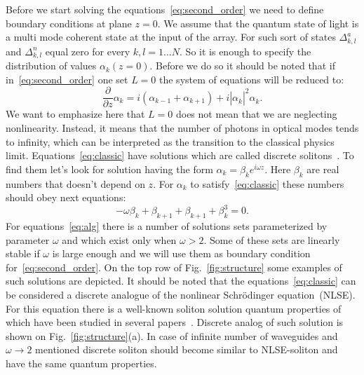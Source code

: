 \documentclass{osa-article}
\begin{document}
\par
Before we start solving the equations~\eqref{eq:second_order}
we need to define boundary conditions at plane $z=0$. 
We assume that the quantum state of light is a multi mode coherent state at the input of the array. For such sort of states $\Delta^{a}_{k,l}$ and $\Delta^{n}_{k,l}$ equal zero for every $k,l = 1\ldots N$. So it is enough to specify the distribution of values $\alpha_k\!\left(z=0\right)$. Before we do so it should be noted that if in~\eqref{eq:second_order} one set $L=0$ the system of equations will be reduced to:
\begin{equation}\label{eq:classic}
	\dfrac{\partial}{\partial z}\alpha_{k}\! =\! i\left(\alpha_{k-1}\! +\! \alpha_{k+1} \right) \!+\! i\left|\alpha^{\phantom{*}}_{k}\!\right|^{2}\alpha^{\phantom{*}}_{k}.
\end{equation}
We want to emphasize here that $ L = 0 $ does not mean that we are neglecting nonlinearity. 
Instead, it means that the number of photons in optical modes tends to infinity, which can be interpreted as the transition to the classical physics limit. 
Equations~\eqref{eq:classic} have solutions which are called discrete solitons~\cite{kevrekidis_discrete_2009}.  
To find them let's look for solution having the form $\alpha_{k} = \beta_k e^{i\omega z}$. Here $\beta_k$ are real numbers that doesn't depend on $z$. 
For $\alpha_{k}$ to satisfy~\eqref{eq:classic} these numbers should obey next equations:
\begin{equation}\label{eq:alg}
	-\omega \beta_k +\beta_{k+1 } + \beta_{k+1} + \beta^{3}_k = 0.
\end{equation}
For equations~\eqref{eq:alg} there is a number of solutions sets parameterized by parameter $\omega$  and which exist only when $\omega > 2$.
Some of these sets are linearly stable if $\omega$ is large enough and we will use them as boundary condition for~\eqref{eq:second_order}.  
On the top row of Fig.~\ref{fig:structure} some examples of such solutions are depicted.  
It should be noted that the equations~\eqref{eq:classic} can be considered a discrete analogue of the nonlinear Schrödinger equation~(NLSE). 
For this equation there is a well-known soliton solution quantum properties of which have been studied in several papers~\cite{corney_quantum_2001,lai_entangled_2009}. 
Discrete analog of such solution is shown on Fig.~\ref{fig:structure}(a). 
In case of infinite number of waveguides and $\omega\rightarrow 2$ mentioned discrete soliton should become similar to NLSE-soliton and have the same quantum properties. 
\end{document}
